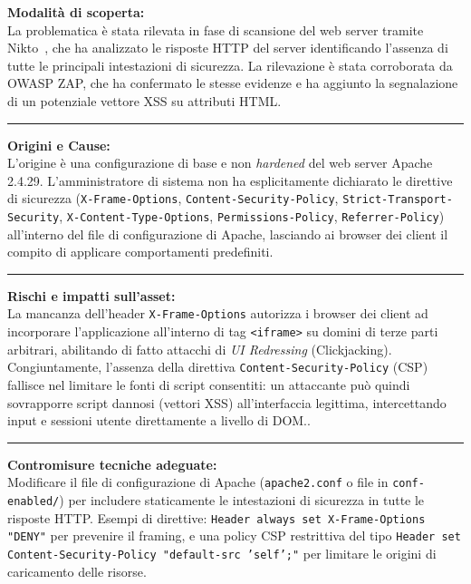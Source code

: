 \documentclass[11pt]{report}
\begin{document}
	\begin{tcolorbox}[colback=gray!5, colframe=headerblue, arc=3pt, boxrule=0.8pt, breakable]
		\textbf{Modalità di scoperta:}\\
		La problematica è stata rilevata in fase di scansione del web server tramite Nikto~\cite{nikto-docs}, che ha analizzato le risposte HTTP del server identificando l'assenza di tutte le principali intestazioni di sicurezza. La rilevazione è stata corroborata da OWASP ZAP, che ha confermato le stesse evidenze e ha aggiunto la segnalazione di un potenziale vettore XSS su attributi HTML.
		
		\vspace{0.2cm}\hrule\vspace{0.2cm}
		
		\textbf{Origini e Cause:}\\
		L'origine è una configurazione di base e non \textit{hardened} del web server Apache 2.4.29. L'amministratore di sistema non ha esplicitamente dichiarato le direttive di sicurezza (\texttt{X-Frame-Options}, \texttt{Content-Security-Policy}, \texttt{Strict-Transport-Security}, \texttt{X-Content-Type-Options}, \texttt{Permissions-Policy}, \texttt{Referrer-Policy}) all'interno del file di configurazione di Apache, lasciando ai browser dei client il compito di applicare comportamenti predefiniti.
		
		\vspace{0.2cm}\hrule\vspace{0.2cm}
		
		\textbf{Rischi e impatti sull'asset:}\\
		La mancanza dell'header \texttt{X-Frame-Options} autorizza i browser dei client ad incorporare l'applicazione all'interno di tag \texttt{<iframe>} su domini di terze parti arbitrari, abilitando di fatto attacchi di \textit{UI Redressing} (Clickjacking). Congiuntamente, l'assenza della direttiva \texttt{Content-Security-Policy} (CSP) fallisce nel limitare le fonti di script consentiti: un attaccante può quindi sovrapporre script dannosi (vettori XSS) all'interfaccia legittima, intercettando input e sessioni utente direttamente a livello di DOM..
		
		\vspace{0.2cm}\hrule\vspace{0.2cm}
		
		\textbf{Contromisure tecniche adeguate:}\\
		Modificare il file di configurazione di Apache (\texttt{apache2.conf} o file in \texttt{conf-enabled/}) per includere staticamente le intestazioni di sicurezza in tutte le risposte HTTP. Esempi di direttive: \texttt{Header always set X-Frame-Options "DENY"} per prevenire il framing, e una policy CSP restrittiva del tipo \texttt{Header set Content-Security-Policy "default-src 'self';"} per limitare le origini di caricamento delle risorse.
	\end{tcolorbox}
	
\end{document}
